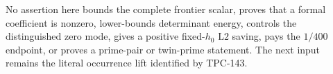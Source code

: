 \documentclass[11pt]{article}
\theoremstyle{definition}
\theoremstyle{remark}
\newcommand{\Ltwo}{\mathrm{L2}}
\begin{document}
No assertion here bounds the complete frontier scalar, proves that a
formal coefficient is nonzero, lower-bounds determinant energy,
controls the distinguished zero mode, gives a positive
fixed-\(h_0\) \(\Ltwo\) saving, pays the \(1/400\) endpoint, or proves
a prime-pair or twin-prime statement.  The next input remains the
literal occurrence lift identified by TPC-143.

\begingroup
\small
\raggedright


\endgroup
\end{document}
